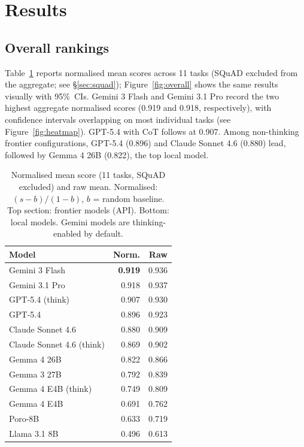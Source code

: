 \documentclass[11pt]{article}
\begin{document}
\section{Results}
\label{sec:results}

\subsection{Overall rankings}

Table~\ref{tab:main} reports normalised mean scores across 11 tasks
(SQuAD excluded from the aggregate; see \S\ref{sec:squad});
Figure~\ref{fig:overall} shows the same results visually with 95\%~CIs.
Gemini 3 Flash and Gemini 3.1 Pro record the two highest aggregate normalised
scores (0.919 and 0.918, respectively), with confidence intervals overlapping
on most individual tasks (see Figure~\ref{fig:heatmap}).
GPT-5.4 with CoT follows at 0.907.
Among non-thinking frontier configurations,
GPT-5.4 (0.896) and Claude Sonnet 4.6 (0.880) lead,
followed by Gemma 4 26B (0.822), the top local model.

\begin{table}[t]
\centering
\small
\begin{tabular}{lrr}
\toprule
\textbf{Model} & \textbf{Norm.} & \textbf{Raw} \\
\midrule
Gemini 3 Flash               & \textbf{0.919} & 0.936 \\
Gemini 3.1 Pro               & 0.918 & 0.937 \\
GPT-5.4 (think)              & 0.907 & 0.930 \\
GPT-5.4                      & 0.896 & 0.923 \\
Claude Sonnet 4.6            & 0.880 & 0.909 \\
Claude Sonnet 4.6 (think)    & 0.869 & 0.902 \\
\midrule
Gemma 4 26B                  & 0.822 & 0.866 \\
Gemma 3 27B                  & 0.792 & 0.839 \\
Gemma 4 E4B (think)          & 0.749 & 0.809 \\
Gemma 4 E4B                  & 0.691 & 0.762 \\
Poro-8B                      & 0.633 & 0.719 \\
Llama 3.1 8B                 & 0.496 & 0.613 \\
\bottomrule
\end{tabular}
\caption{Normalised mean score (11 tasks, SQuAD excluded) and raw mean.
  Normalised: $(s - b)/(1-b)$, $b$ = random baseline.
  Top section: frontier models (API). Bottom: local models.
  Gemini models are thinking-enabled by default.}
\label{tab:main}
\end{table}
\end{document}
